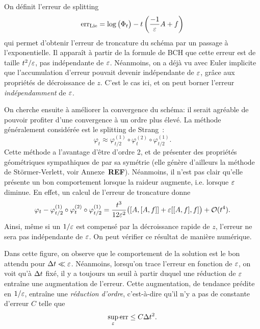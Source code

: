 On définit l'erreur de splitting 
\begin{equation*}
    \operatorname{err}_{\mathrm{Lie}} 
    = \log \big( \Phi_t \big) - t\left(\frac{-1}{\varepsilon}A + f\right) 
\end{equation*}
qui permet d'obtenir l'erreur de troncature du schéma par un passage à l'exponentielle. Il apparaît à partir de la formule de BCH que cette erreur est de taille $t^2/\varepsilon$, pas indépendante de $\varepsilon$. Néanmoins, on a déjà vu avec Euler implicite que l'accumulation d'erreur pouvait devenir indépendante de $\varepsilon$, grâce aux propriétés de décroissance de $z$. C'est le cas ici, et on peut borner l'erreur \textit{indépendamment} de $\varepsilon$. 

On cherche ensuite à améliorer la convergence du schéma: il serait agréable de pouvoir profiter d'une convergence à un ordre plus élevé. La méthode généralement considérée est le splitting de Strang~:
\begin{equation*}
    \varphi_t \approx \varphi^{(1)}_{t/2} \circ \varphi^{(2)}_{t} \circ \varphi^{(1)}_{t/2} .
\end{equation*}
Cette méthode a l'avantage d'être d'ordre 2, et de présenter des propriétés géométriques sympathiques de par sa symétrie (elle génère d'ailleurs la méthode de Störmer-Verlett, voir Annexe~\textbf{REF}). Néanmoins, il n'est pas clair qu'elle présente un bon comportement lorsque la raideur augmente, i.e. lorsque $\varepsilon$ diminue. En effet, un calcul de l'erreur de troncature donne 
\begin{equation*}
    \varphi_t - \varphi^{(1)}_{t/2} \circ \varphi^{(2)}_{t} \circ \varphi^{(1)}_{t/2} 
    = \frac{t^3}{12\varepsilon^2} \big( [A,[A,f]] + \varepsilon [[A,f],f] \big)
    + \mathcal{O}(t^4) .
\end{equation*}
Ainsi, même si un $1/\varepsilon$ est compensé par la décroissance rapide de $z$, l'erreur ne sera pas indépendante de $\varepsilon$. On peut vérifier ce résultat de manière numérique.


Dans cette figure, on observe que le comportement de la solution est le bon attendu pour $\Delta t \ll \varepsilon$. Néanmoins, lorsqu'on trace l'erreur en fonction de $\varepsilon$, on voit qu'à $\Delta t$ fixé, il y a toujours un seuil à partir duquel une réduction de $\varepsilon$ entraîne une augmentation de l'erreur. Cette augmentation, de tendance prédite en $1/\varepsilon$, entraîne une \textit{réduction d'ordre}, c'est-à-dire qu'il n'y a pas de constante d'erreur $C$ telle que 
\begin{equation*}
    \sup_{\varepsilon} \operatorname{err} \leq C \Delta t^2 .
\end{equation*}

